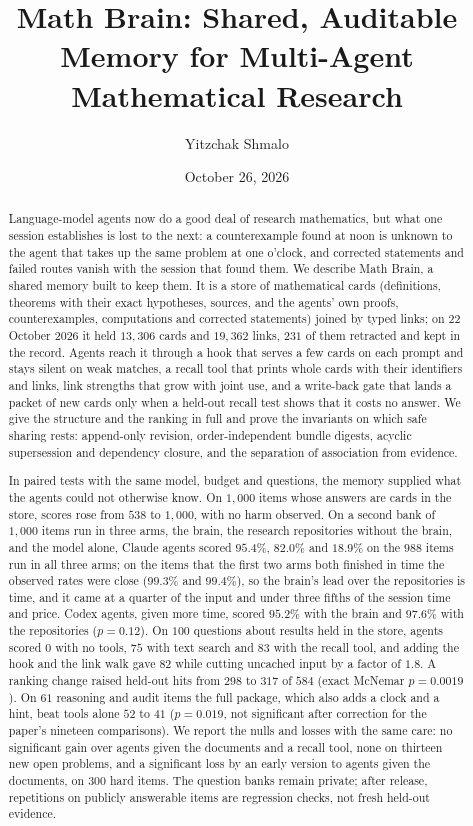 \documentclass[11pt,reqno]{amsart}
\title[Shared memory for multi-agent mathematical research]{Math Brain: Shared, Auditable Memory for Multi-Agent Mathematical Research}
\author{Yitzchak Shmalo}
\date{October 26, 2026}
\theoremstyle{plain}
\theoremstyle{definition}
\theoremstyle{remark}
\begin{document}
\begin{abstract}
Language-model agents now do a good deal of research mathematics, but what one session establishes is lost to the next: a counterexample found at noon is unknown to the agent that takes up the same problem at one o'clock, and corrected statements and failed routes vanish with the session that found them. We describe Math Brain, a shared memory built to keep them. It is a store of mathematical cards (definitions, theorems with their exact hypotheses, sources, and the agents' own proofs, counterexamples, computations and corrected statements) joined by typed links; on 22 October 2026 it held $13{,}306$ cards and $19{,}362$ links, $231$ of them retracted and kept in the record. Agents reach it through a hook that serves a few cards on each prompt and stays silent on weak matches, a recall tool that prints whole cards with their identifiers and links, link strengths that grow with joint use, and a write-back gate that lands a packet of new cards only when a held-out recall test shows that it costs no answer. We give the structure and the ranking in full and prove the invariants on which safe sharing rests: append-only revision, order-independent bundle digests, acyclic supersession and dependency closure, and the separation of association from evidence.

In paired tests with the same model, budget and questions, the memory supplied what the agents could not otherwise know. On $1{,}000$ items whose answers are cards in the store, scores rose from $538$ to $1{,}000$, with no harm observed. On a second bank of $1{,}000$ items run in three arms, the brain, the research repositories without the brain, and the model alone, Claude agents scored $95.4\%$, $82.0\%$ and $18.9\%$ on the $988$ items run in all three arms; on the items that the first two arms both finished in time the observed rates were close ($99.3\%$ and $99.4\%$), so the brain's lead over the repositories is time, and it came at a quarter of the input and under three fifths of the session time and price. Codex agents, given more time, scored $95.2\%$ with the brain and $97.6\%$ with the repositories ($p=0.12$). On $100$ questions about results held in the store, agents scored $0$ with no tools, $75$ with text search and $83$ with the recall tool, and adding the hook and the link walk gave $82$ while cutting uncached input by a factor of $1.8$. A ranking change raised held-out hits from $298$ to $317$ of $584$ (exact McNemar $p=0.0019$). On $61$ reasoning and audit items the full package, which also adds a clock and a hint, beat tools alone $52$ to $41$ ($p=0.019$, not significant after correction for the paper's nineteen comparisons). We report the nulls and losses with the same care: no significant gain over agents given the documents and a recall tool, none on thirteen new open problems, and a significant loss by an early version to agents given the documents, on $300$ hard items. The question banks remain private; after release, repetitions on publicly answerable items are regression checks, not fresh held-out evidence.


\end{abstract}
\end{document}
